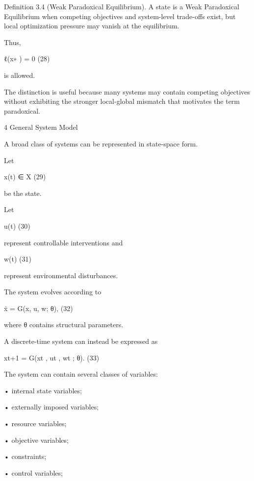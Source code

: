 \documentclass[10pt,a4paper]{article}
\begin{document}
\begin{ManuscriptText}
Definition 3.4 (Weak Paradoxical Equilibrium). A state is a Weak Paradoxical Equilibrium
when competing objectives and system-level trade-offs exist, but local optimization pressure may
vanish at the equilibrium.

Thus,


                                              ℓ(x∗ ) = 0                                        (28)


is allowed.

The distinction is useful because many systems may contain competing objectives without exhibiting
the stronger local-global mismatch that motivates the term paradoxical.


4     General System Model

A broad class of systems can be represented in state-space form.

Let


                                              x(t) ∈ X                                        (29)

be the state.

Let


                                                 u(t)                                         (30)

represent controllable interventions and


                                                w(t)                                          (31)

represent environmental disturbances.

The system evolves according to


                                         ẋ = G(x, u, w; θ),                                  (32)

where θ contains structural parameters.

A discrete-time system can instead be expressed as


                                      xt+1 = G(xt , ut , wt ; θ).                             (33)

The system can contain several classes of variables:


    • internal state variables;

    • externally imposed variables;

    • resource variables;

    • objective variables;

    • constraints;


    • control variables;


\end{ManuscriptText}
\end{document}
